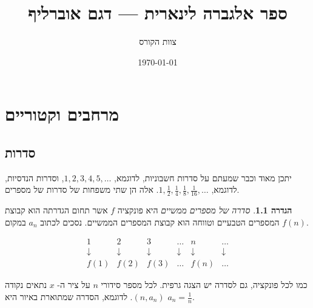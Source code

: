 \documentclass[12pt]{book}
\title{ספר אלגברה לינארית — דגם אוברליף}
\author{צוות הקורס}
\date{\today}
\theoremstyle{plain}
\theoremstyle{definition}
\newtheorem{definition}[theorem]{הגדרה}
\begin{document}
\frontmatter
\maketitle
\tableofcontents
\mainmatter

\chapter{מרחבים וקטוריים}
\section{סדרות}

יתכן מאוד וכבר שמעתם על סדרות חשבוניות,
לדוגמא,
$1,2,3,4,5,\ldots$, 
וסדרות הנדסיות, 
לדוגמא, 
$1,\frac{1}{2},\frac{1}{4},\frac{1}{8},\frac{1}{16},\ldots$. 
אלה הן שתי משפחות של סדרות של מספרים.		 
\begin{definition}
{\it סדרה של מספרים ממשיים} 
היא פונקציה 
$f$ 
אשר תחום הגדרתה הוא קבוצת המספרים הטבעיים וטווחה הוא קבוצת המספרים הממשיים. 
נסכים לכתוב 
$a_n$ 
במקום 
$f(n)$.
\end{definition}
\[
\begin{array}{cccccc}
1 & 2 & 3 & \ldots & n & \ldots \\
\downarrow & \downarrow & \downarrow & \downarrow & \downarrow & \downarrow \\
f(1) & f(2) & f(3) & \ldots & f(n) & \ldots
\end{array}
\]


כמו לכל פונקציה, גם לסדרה יש הצגה גרפית. לכל מספר סידורי 
$n$ 
על ציר ה- 
$x$ 
נתאים 
נקודה 
$(n,a_n)$. 
לדוגמא, הסדרה שמתוארת באיור היא 
$a_n=\frac{1}{n}$. 


\vspace{1cm}

\begin{center}
\end{center}
\end{document}
